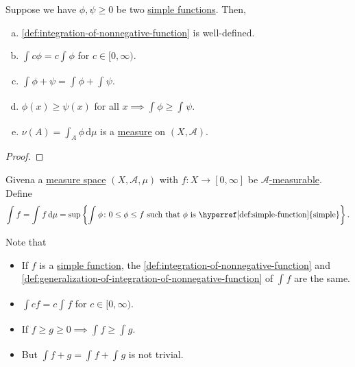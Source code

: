 \begin{proposition}
	Suppose we have \(\phi, \psi \geq 0\) be two \hyperref[def:simple-function]{simple functions}. Then,
	\begin{enumerate}[(a)]
		\item \autoref{def:integration-of-nonnegative-function} is well-defined.
		\item \(\int_{}^{} c\phi = c \int_{}^{} \phi \) for \(c\in [0, \infty )\).
		\item \(\int_{}^{} \phi + \psi  =  \int_{}^{} \phi + \int_{}^{} \psi\).
		\item \(\phi (x) \geq \psi (x)\) for all \(x \implies \int_{}^{} \phi \geq \int_{}^{} \psi \).
		\item\label{prop:nu-measure} \(\nu (A) = \int_{A}^{} \phi  \,\mathrm{d}\mu  \) is a \hyperref[def:measure]{measure} on \((X, \mathcal{A} )\).
	\end{enumerate}
\end{proposition}
\begin{proof}
\end{proof}

\begin{definition}\label{def:generalization-of-integration-of-nonnegative-function}
	Givena a \hyperref[def:measure-space]{measure space} \((X, \mathcal{A} , \mu )\) with \(f\colon X\to [0, \infty ]\) be \hyperref[def:A-measurable-function]{\(\mathcal{A}\)-measurable}. Define
	\[
		\int_{}^{} f= \int_{}^{} f \,\mathrm{d}\mu = \sup \left\{\int_{}^{} \phi \colon 0\leq \phi \leq f \text{ such that \(\phi\) is \hyperref[def:simple-function]{simple}}  \right\}.
	\]
\end{definition}
\begin{note}
	Note that
	\begin{itemize}
		\item If \(f\) is a \hyperref[def:simple-function]{simple function}, the \autoref{def:integration-of-nonnegative-function} and \autoref{def:generalization-of-integration-of-nonnegative-function} of \(\int_{}^{} f \) are the same.
		\item \(\int cf = c\int_{}^{} f\) for \(c\in [0, \infty )\).
		\item If \(f\geq g \geq 0 \implies \int_{}^{} f\geq \int_{}^{} g\).
		\item But \(\int f+g = \int_{}^{} f + \int_{}^{} g\) is not trivial.
	\end{itemize}
\end{note}

